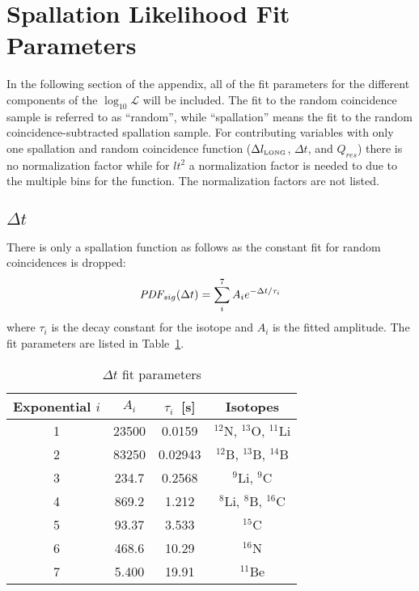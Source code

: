 \section{Spallation Likelihood Fit Parameters}
\label{appendix_fitparam}

In the following section of the appendix, all of the fit parameters for the different components of the $\log_{10}\mathcal{L}$ will be included. The
fit to the random coincidence sample is referred to as ``random'', while ``spallation'' means the fit to the random coincidence-subtracted spallation sample. For contributing variables with only one spallation and random coincidence function ($\Delta l_{\mbox{\tiny LONG}}$, $\Delta t$, and $Q_{res}$) there is no normalization factor while for $lt^2$ a normalization factor is needed to due to the multiple bins for the function. The normalization factors are not listed.

\subsection{$\Delta t$}
There is only a spallation function as follows as the constant fit for random coincidences is dropped:
\begin{equation}
    \mbox{\it PDF}_{sig}(\Delta t) = \sum_i^7 A_i e^{-\Delta t/\tau_i}
\end{equation}
where $\tau_i$ is the decay constant for the isotope and $A_i$ is the fitted amplitude. The fit parameters are listed in Table~\ref{tab:fitdt}.
\begin{table}[h]
    \centering
        \caption{$\Delta t$ fit parameters}
    \begin{tabular}{cccc}
        \toprule
         Exponential $i$ & $A_i$ & $\tau_{i}$~[s] & Isotopes \\ \hline
         1 & 23500 & 0.0159 & $^{12}$N, $^{13}$O, $^{11}$Li\\
         2 & 83250 & 0.02943 & $^{12}$B, $^{13}$B, $^{14}$B\\
         3 & 234.7 & 0.2568 & $^9$Li, $^9$C \\
         4 & 869.2 & 1.212 & $^8$Li, $^8$B, $^{16}$C\\
         5 & 93.37 & 3.533 & $^{15}$C \\
         6 & 468.6 & 10.29 & $^{16}$N \\
         7 & 5.400 & 19.91 & $^{11}$Be \\ \bottomrule        %
    \end{tabular}
    \label{tab:fitdt}
\end{table}

